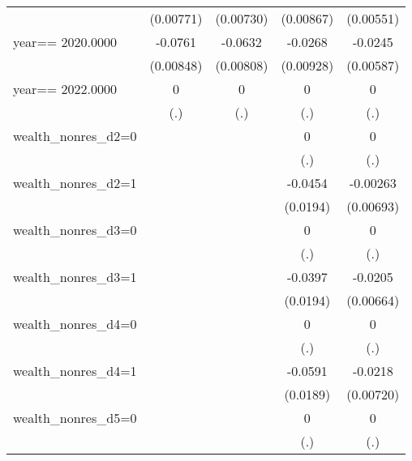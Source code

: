 \begin{table}[htbp]
\begin{tabular}{l*{4}{c}}
                &(0.00771)         &(0.00730)         &(0.00867)         &(0.00551)         \\
\addlinespace
year==  2020.0000&  -0.0761\sym{***}&  -0.0632\sym{***}&  -0.0268\sym{***}&  -0.0245\sym{***}\\
                &(0.00848)         &(0.00808)         &(0.00928)         &(0.00587)         \\
\addlinespace
year==  2022.0000&        0         &        0         &        0         &        0         \\
                &      (.)         &      (.)         &      (.)         &      (.)         \\
\addlinespace
wealth\_nonres\_d2=0&                  &                  &        0         &        0         \\
                &                  &                  &      (.)         &      (.)         \\
\addlinespace
wealth\_nonres\_d2=1&                  &                  &  -0.0454\sym{**} & -0.00263         \\
                &                  &                  & (0.0194)         &(0.00693)         \\
\addlinespace
wealth\_nonres\_d3=0&                  &                  &        0         &        0         \\
                &                  &                  &      (.)         &      (.)         \\
\addlinespace
wealth\_nonres\_d3=1&                  &                  &  -0.0397\sym{**} &  -0.0205\sym{***}\\
                &                  &                  & (0.0194)         &(0.00664)         \\
\addlinespace
wealth\_nonres\_d4=0&                  &                  &        0         &        0         \\
                &                  &                  &      (.)         &      (.)         \\
\addlinespace
wealth\_nonres\_d4=1&                  &                  &  -0.0591\sym{***}&  -0.0218\sym{***}\\
                &                  &                  & (0.0189)         &(0.00720)         \\
\addlinespace
wealth\_nonres\_d5=0&                  &                  &        0         &        0         \\
                &                  &                  &      (.)         &      (.)         \\

\end{tabular}
\end{table}
